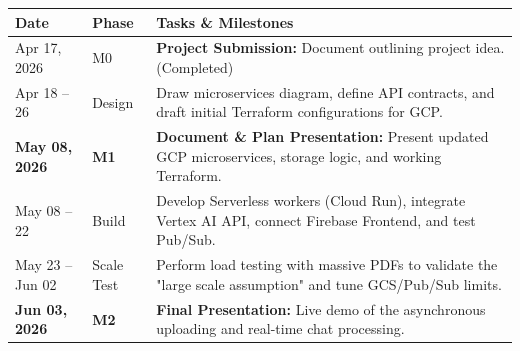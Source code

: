 \documentclass[12pt,a4paper]{article}
\begin{document}
\vspace{0.5cm}
\noindent
\begin{tabularx}{\textwidth}{@{} l l X @{}}
\toprule
\textbf{Date} & \textbf{Phase} & \textbf{Tasks \& Milestones} \\
\midrule
Apr 17, 2026 & M0 & \textbf{Project Submission:} Document outlining project idea. (Completed) \\
\addlinespace
Apr 18 -- 26 & Design & Draw microservices diagram, define API contracts, and draft initial Terraform configurations for GCP. \\
\addlinespace
\textbf{May 08, 2026} & \textbf{M1} & \textbf{Document \& Plan Presentation:} Present updated GCP microservices, storage logic, and working Terraform. \\
\addlinespace
May 08 -- 22 & Build & Develop Serverless workers (Cloud Run), integrate Vertex AI API, connect Firebase Frontend, and test Pub/Sub. \\
\addlinespace
May 23 -- Jun 02 & Scale Test & Perform load testing with massive PDFs to validate the "large scale assumption" and tune GCS/Pub/Sub limits. \\
\addlinespace
\textbf{Jun 03, 2026} & \textbf{M2} & \textbf{Final Presentation:} Live demo of the asynchronous uploading and real-time chat processing. \\
\bottomrule
\end{tabularx}
\end{document}

